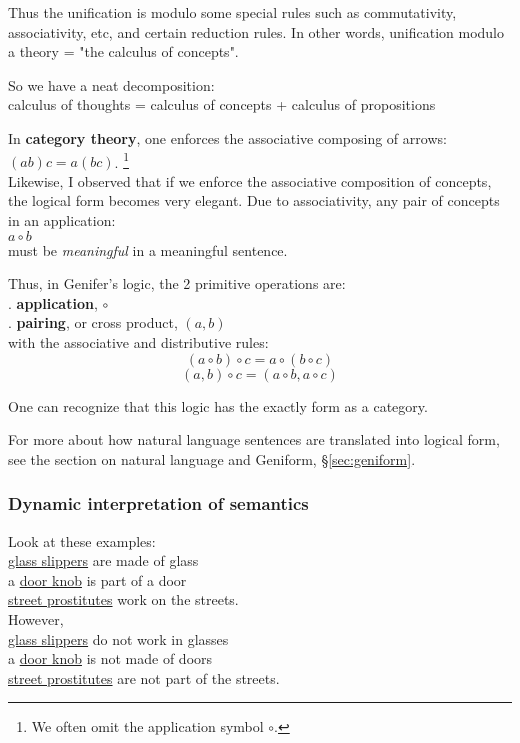 Thus the unification is modulo some special rules such as commutativity, associativity, etc, and certain reduction rules.  In other words, unification modulo a theory = "the calculus of concepts".

So we have a neat decomposition:\\
\tab calculus of thoughts = calculus of concepts + calculus of propositions

In \textbf{category theory}, one enforces the associative composing of arrows:\\
\tab $(ab)c = a(bc)$. \footnote{We often omit the application symbol $\circ$.}\\
Likewise, I observed that if we enforce the associative composition of concepts, the logical form becomes very elegant.  Due to associativity, any pair of concepts in an application:\\
\tab $a \circ b$\\
must be \textit{meaningful} in a meaningful sentence.

Thus, in Genifer's logic, the 2 primitive operations are:\\
. \textbf{application}, $\circ$\\
. \textbf{pairing}, or cross product, $(a,b)$\\
with the associative and distributive rules:
$$ (a \circ b) \circ c = a \circ (b \circ c) $$
$$ (a, b) \circ c = (a \circ b, a \circ c)$$

One can recognize that this logic has the exactly form as a category.  

For more about how natural language sentences are translated into logical form, see the section on natural language and Geniform, \S\ref{sec:geniform}.

\subsubsection{Dynamic interpretation of semantics}

Look at these examples:\\
\tab \underline{glass slippers} are made of glass\\
\tab a \underline{door knob} is part of a door\\
\tab \underline{street prostitutes} work on the streets.\\
However,\\
\tab \underline{glass slippers} do not work in glasses\\
\tab a \underline{door knob} is not made of doors\\
\tab \underline{street prostitutes} are not part of the streets.

